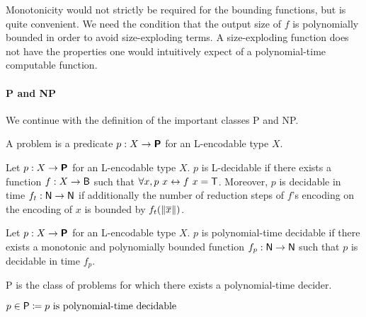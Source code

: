 Monotonicity would not strictly be required for the bounding functions, but is quite convenient. We need the condition that the output size of $f$ is polynomially bounded in order to avoid size-exploding terms. A size-exploding function does not have the properties one would intuitively expect of a polynomial-time computable function.

\paragraph{\textsf{P} and \textsf{NP}}
We continue with the definition of the important classes \textsf{P} and \textsf{NP}. 

A problem is a predicate $p : X \rightarrow \textsf{\bfseries P}$ for an L-encodable type $X$.
\begin{definition}
  Let $p : X \rightarrow \textsf{\bfseries P}$ for an L-encodable type $X$. $p$ is L-decidable if there exists a function $f : X \rightarrow \textsf{B}$ such that 
  $\forall x, p~x \leftrightarrow f~x = \mathsf{T}$. 
  Moreover, $p$ is decidable in time $f_t : \mathsf{N} \rightarrow \mathsf{N}$ if additionally the number of reduction steps of $f$'s encoding on the encoding of $x$ is bounded by $f_t(\left\lVert\overline{x}\right\rVert)$.
\end{definition}

\begin{definition}
  Let $p : X \rightarrow \textsf{\bfseries P}$ for an L-encodable type $X$. $p$ is polynomial-time decidable if there exists a monotonic and polynomially bounded function $f_p : \mathsf{N} \rightarrow \mathsf{N}$ such that $p$ is decidable in time $f_p$. 
\end{definition}

\textsf{P} is the class of problems for which there exists a polynomial-time decider. 
\begin{definition}[\textsf{P}]
  $p \in \textsf{P} \coloneqq p \text{ is polynomial-time decidable} $
\end{definition}

